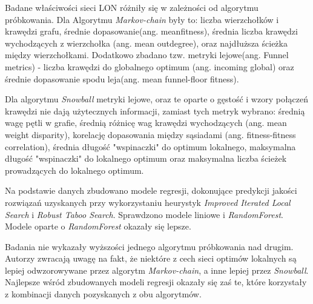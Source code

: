 Badane właściwości sieci LON różniły się w zależności od algorytmu próbkowania.
Dla Algorytmu \textit{Markov-chain} były to: liczba wierzchołków i krawędzi grafu, średnie dopasowanie(ang. meanfitness),
średnia liczba krawędzi wychodzących z wierzchołka (ang. mean outdegree), oraz najdłuższa ścieżka między wierzchołkami.
Dodatkowo zbadano tzw. metryki lejowe(ang. Funnel metrics) - liczba krawędzi do globalnego optimum (ang. incoming global)
oraz średnie dopasowanie spodu leja(ang. mean funnel-floor fitness).

Dla algorytmu \textit{Snowball} metryki lejowe, oraz te oparte o gęstość i wzory połączeń krawędzi nie dają użytecznych informacji,
zamiast tych metryk wybrano: średnią wagę pętli w grafie, średnią różnicę wag krawędzi wychodzących (ang. mean weight disparity),
korelację dopasowania między sąsiadami (ang. fitness-fitness correlation), średnia długość "wspinaczki" do optimum lokalnego,
maksymalna długość "wspinaczki" do lokalnego optimum oraz maksymalna liczba ścieżek prowadzących do lokalnego optimum.

Na podstawie danych zbudowano modele regresji, dokonujące predykcji jakości rozwiązań
uzyskanych przy wykorzystaniu heurystyk \textit{Improved Iterated Local Search} i \textit{Robust Taboo Search}.
Sprawdzono modele liniowe i \textit{RandomForest}. Modele oparte o \textit{RandomForest} okazały się lepsze.

Badania nie wykazały wyższości jednego algorytmu próbkowania nad drugim. Autorzy zwracają uwagę na fakt, że niektóre z cech
sieci optimów lokalnych są lepiej odwzorowywane przez algorytm \textit{Markov-chain}, a inne lepiej przez \textit{Snowball}.
Najlepsze wśród zbudowanych modeli regresji okazały się zaś te, które korzystały z kombinacji danych pozyskanych z obu algorytmów.

